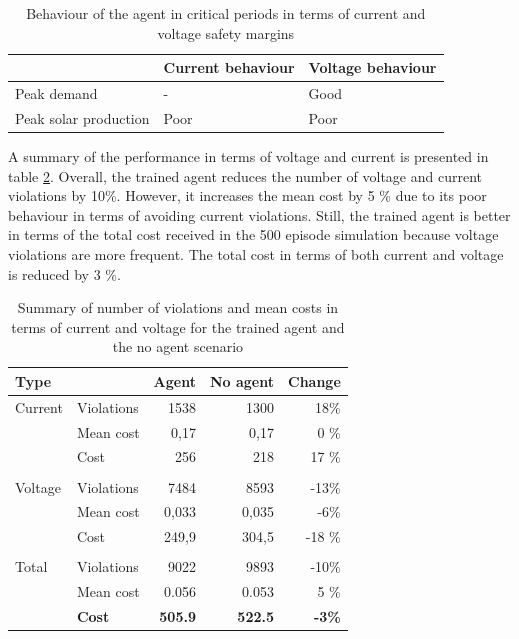 \documentclass[class=book, crop=false]{standalone}
\begin{document}
\begin{table}[h]
\center
\begin{tabular}{l|ll}
                      & Current behaviour     & Voltage behaviour \\
\hline
Peak demand           & - & Good              \\
Peak solar production & Poor                  & Poor \\
\hline
\end{tabular}
\caption{Behaviour of the agent in critical periods in terms of current and voltage safety margins}
\label{table:results:config1_behaviour}
\end{table}
 A summary of the performance in terms of voltage and current is presented in table \ref{table:results:config1_summary}. Overall, the trained agent reduces the number of voltage and current violations by 10\%. However, it increases the mean cost by 5 \% due to its poor behaviour in terms of avoiding current violations. Still, the trained agent is better in terms of the total cost received in the 500 episode simulation because voltage violations are more frequent. The total cost in terms of both current and voltage is reduced by 3 \%.


\begin{table}[h]
\center
\begin{tabular}{l|lrrr}
Type      &               & Agent          & No agent       & Change        \\
\hline
Current   & Violations    & 1538            & 1300            & 18\%            \\
          & Mean cost     & 0,17           & 0,17           & 0 \%         \\
          & Cost          & 256            & 218            & 17 \%         \\
          &               &                &                &               \\
Voltage   & Violations    & 7484           & 8593           & -13\%          \\
          & Mean  cost    & 0,033          & 0,035          & -6\%          \\
          & Cost          & 249,9          & 304,5         & -18 \%        \\
          &               &                &                &               \\
Total     & Violations    & 9022           & 9893           & -10\%          \\
          & Mean cost     & 0.056          & 0.053          & 5 \%         \\
\textbf{} & \textbf{Cost} & \textbf{505.9} & \textbf{522.5} & \textbf{-3\%} \\
\hline
\end{tabular}
\caption{Summary of number of violations and mean costs in terms of current and voltage for the trained agent and the no agent scenario}
\label{table:results:config1_summary}
\end{table}
\end{document}
